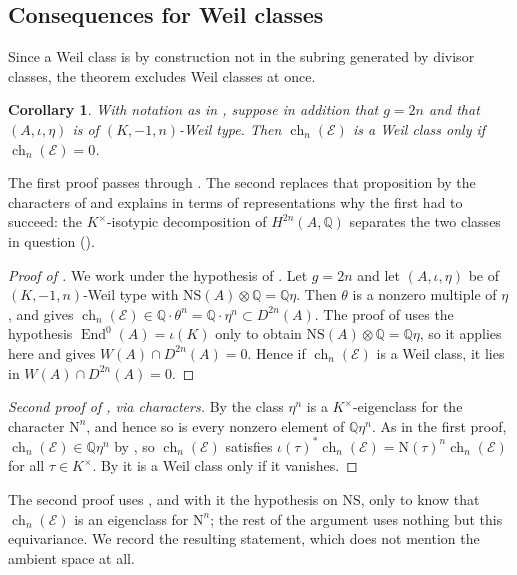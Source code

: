 \documentclass[11pt,reqno]{amsart}
\theoremstyle{plain}
\newtheorem{corollary}[theorem]{Corollary}
\theoremstyle{definition}
\theoremstyle{remark}
\newcommand{\QQ}{\mathbb{Q}}
\newcommand{\cE}{\mathcal{E}}
\newcommand{\HW}{W}                      %
\newcommand{\NS}{\mathrm{NS}}
\newcommand{\Nm}{\mathrm{N}}             %
\DeclareMathOperator{\ch}{ch}
\DeclareMathOperator{\End}{End}
\newcommand{\Kx}{K^{\times}}
\begin{document}
\subsection{Consequences for Weil classes}

Since a Weil class is by construction not in the subring generated by divisor
classes, the theorem excludes Weil classes at once.

\begin{corollary}\label{cor:neverweil}
With notation as in , suppose in addition that $g=2n$ and
that $(A,\iota,\eta)$ is of $(K,-1,n)$-Weil type. Then $\ch_{n}(\cE)$ is a
Weil class only if $\ch_{n}(\cE)=0$.
\end{corollary}

The first proof passes through . The second replaces that
proposition by the characters of  and explains in terms
of representations why the first had to succeed: the $\Kx$-isotypic
decomposition of $H^{2n}(A,\QQ)$ separates the two classes in question
().

\begin{proof}[Proof of ]
We work under the hypothesis of . Let $g=2n$ and let
$(A,\iota,\eta)$ be of $(K,-1,n)$-Weil type with
$\NS(A)\otimes\QQ=\QQ\eta$. Then $\theta$ is a nonzero multiple of $\eta$,
and  gives
$\ch_{n}(\cE)\in\QQ\cdot\theta^{n}=\QQ\cdot\eta^{n}\subset D^{2n}(A)$. The
proof of  uses the hypothesis $\End^{0}(A)=\iota(K)$ only
to obtain $\NS(A)\otimes\QQ=\QQ\eta$, so it applies here and gives
$\HW(A)\cap D^{2n}(A)=0$. Hence if $\ch_{n}(\cE)$ is a Weil class, it lies in
$\HW(A)\cap D^{2n}(A)=0$.
\end{proof}

\begin{proof}[Second proof of , via characters]
By  the class $\eta^{n}$ is a $\Kx$-eigenclass for the
character $\Nm^{n}$, and hence so is every nonzero element of $\QQ\eta^{n}$.
As in the first proof, $\ch_{n}(\cE)\in\QQ\eta^{n}$ by
, so $\ch_{n}(\cE)$ satisfies
$\iota(\tau)^{*}\ch_{n}(\cE)=\Nm(\tau)^{n}\ch_{n}(\cE)$ for all $\tau\in\Kx$.
By  it is a Weil class only if it vanishes.
\end{proof}

The second proof uses , and with it the hypothesis on
$\NS$, only to know that $\ch_{n}(\cE)$ is an eigenclass for $\Nm^{n}$; the
rest of the argument uses nothing but this equivariance. We record the
resulting statement, which does not mention the ambient space at all.
\end{document}
